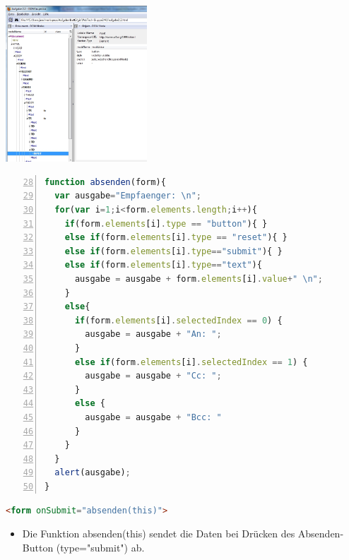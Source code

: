 \begin{frame}[<+->]
\includegraphics[width = 200px]{../A2/src/dom_inspector.jpg}
\end{frame}
\begin{frame}[<+->][fragile]
\tiny{\begin{lstlisting}[language=JavaScript, 
		   numbers=left,
		   numbersep=3pt,
		   firstnumber=28]
function absenden(form){
  var ausgabe="Empfaenger: \n";
  for(var i=1;i<form.elements.length;i++){
    if(form.elements[i].type == "button"){ }
    else if(form.elements[i].type == "reset"){ }
    else if(form.elements[i].type=="submit"){ }
    else if(form.elements[i].type=="text"){
      ausgabe = ausgabe + form.elements[i].value+" \n";
    }
    else{
      if(form.elements[i].selectedIndex == 0) {
        ausgabe = ausgabe + "An: ";	 
      }
      else if(form.elements[i].selectedIndex == 1) {
        ausgabe = ausgabe + "Cc: ";
      }
      else {
        ausgabe = ausgabe + "Bcc: "
      }
    }
  }
  alert(ausgabe);
}
\end{lstlisting}}
\tiny{\begin{lstlisting}[language = HTML,
                                   mathescape = true, 
                   breaklines=true,  
                   numbersep = 3pt]
<form onSubmit="absenden(this)">
\end{lstlisting}}
\normalsize
\begin{itemize}

\item Die Funktion absenden(this) sendet die Daten bei Drücken des Absenden-Button (type="submit") ab.

\end{itemize}
\end{frame}